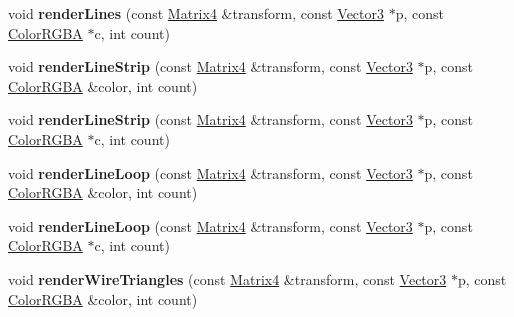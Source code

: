 \begin{DoxyCompactItemize}
\item 
void {\bfseries render\+Lines} (const \hyperlink{class_magnum_1_1_matrix4}{Matrix4} \&transform, const \hyperlink{class_magnum_1_1_vector3}{Vector3} $\ast$p, const \hyperlink{class_magnum_1_1_color_r_g_b_a}{Color\+R\+G\+BA} $\ast$c, int count)\hypertarget{class_magnum_1_1_i_component_debug_renderer_acad7ba9a4165e9e4c7f65fe81cff7228}{}\label{class_magnum_1_1_i_component_debug_renderer_acad7ba9a4165e9e4c7f65fe81cff7228}

\item 
void {\bfseries render\+Line\+Strip} (const \hyperlink{class_magnum_1_1_matrix4}{Matrix4} \&transform, const \hyperlink{class_magnum_1_1_vector3}{Vector3} $\ast$p, const \hyperlink{class_magnum_1_1_color_r_g_b_a}{Color\+R\+G\+BA} \&color, int count)\hypertarget{class_magnum_1_1_i_component_debug_renderer_aabc866fb644333d92aa8b90f930ebc74}{}\label{class_magnum_1_1_i_component_debug_renderer_aabc866fb644333d92aa8b90f930ebc74}

\item 
void {\bfseries render\+Line\+Strip} (const \hyperlink{class_magnum_1_1_matrix4}{Matrix4} \&transform, const \hyperlink{class_magnum_1_1_vector3}{Vector3} $\ast$p, const \hyperlink{class_magnum_1_1_color_r_g_b_a}{Color\+R\+G\+BA} $\ast$c, int count)\hypertarget{class_magnum_1_1_i_component_debug_renderer_a6ff705c1e2e9d08861450e67f7cc7ce1}{}\label{class_magnum_1_1_i_component_debug_renderer_a6ff705c1e2e9d08861450e67f7cc7ce1}

\item 
void {\bfseries render\+Line\+Loop} (const \hyperlink{class_magnum_1_1_matrix4}{Matrix4} \&transform, const \hyperlink{class_magnum_1_1_vector3}{Vector3} $\ast$p, const \hyperlink{class_magnum_1_1_color_r_g_b_a}{Color\+R\+G\+BA} \&color, int count)\hypertarget{class_magnum_1_1_i_component_debug_renderer_a3e49447cb09f2fe4f554802a6a714989}{}\label{class_magnum_1_1_i_component_debug_renderer_a3e49447cb09f2fe4f554802a6a714989}

\item 
void {\bfseries render\+Line\+Loop} (const \hyperlink{class_magnum_1_1_matrix4}{Matrix4} \&transform, const \hyperlink{class_magnum_1_1_vector3}{Vector3} $\ast$p, const \hyperlink{class_magnum_1_1_color_r_g_b_a}{Color\+R\+G\+BA} $\ast$c, int count)\hypertarget{class_magnum_1_1_i_component_debug_renderer_adee7ec3d3067b2671f18f8c64c2ad7af}{}\label{class_magnum_1_1_i_component_debug_renderer_adee7ec3d3067b2671f18f8c64c2ad7af}

\item 
void {\bfseries render\+Wire\+Triangles} (const \hyperlink{class_magnum_1_1_matrix4}{Matrix4} \&transform, const \hyperlink{class_magnum_1_1_vector3}{Vector3} $\ast$p, const \hyperlink{class_magnum_1_1_color_r_g_b_a}{Color\+R\+G\+BA} \&color, int count)\hypertarget{class_magnum_1_1_i_component_debug_renderer_af372c93580e0832346b311c0daf26872}{}\label{class_magnum_1_1_i_component_debug_renderer_af372c93580e0832346b311c0daf26872}


\end{DoxyCompactItemize}
